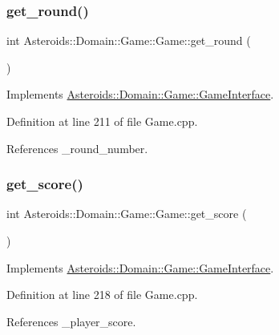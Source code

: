 \subsubsection{\texorpdfstring{get\+\_\+round()}{get\_round()}}
{\footnotesize\ttfamily int Asteroids\+::\+Domain\+::\+Game\+::\+Game\+::get\+\_\+round (\begin{DoxyParamCaption}{ }\end{DoxyParamCaption})\hspace{0.3cm}{\ttfamily [virtual]}}



Implements \hyperlink{classAsteroids_1_1Domain_1_1Game_1_1GameInterface_ac8da5febc9e8115eb166fe9238c32772}{Asteroids\+::\+Domain\+::\+Game\+::\+Game\+Interface}.



Definition at line 211 of file Game.\+cpp.



References \+\_\+round\+\_\+number.

\mbox{\label{classAsteroids_1_1Domain_1_1Game_1_1Game_ae2128bded3b91a2bbf7546009a8e5385}} 
\subsubsection{\texorpdfstring{get\+\_\+score()}{get\_score()}}
{\footnotesize\ttfamily int Asteroids\+::\+Domain\+::\+Game\+::\+Game\+::get\+\_\+score (\begin{DoxyParamCaption}{ }\end{DoxyParamCaption})\hspace{0.3cm}{\ttfamily [virtual]}}



Implements \hyperlink{classAsteroids_1_1Domain_1_1Game_1_1GameInterface_a8f7ade2512ff188e0647a329acb34848}{Asteroids\+::\+Domain\+::\+Game\+::\+Game\+Interface}.



Definition at line 218 of file Game.\+cpp.



References \+\_\+player\+\_\+score.

\mbox{\label{classAsteroids_1_1Domain_1_1Game_1_1Game_a4dea8a8da52ffe1589fe9c4493824d0f}} 
